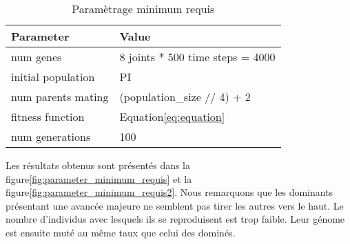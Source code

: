 \documentclass[journal, a4paper]{IEEEtran}
\begin{document}
	\begin{table}[!hbt]
		\begin{center}
		\caption{Paramètrage minimum requis}
		\label{tab:Parametrage_minimum_requis}
		\begin{tabular}{|l|l|}
			\hline
			\textbf{Parameter} & \textbf{Value} \\
			\hline
			num genes & 8 joints * 500 time steps = 4000 \\
			\hline
			initial population & PI \\
			\hline
			num parents mating & (population\_size // 4) + 2 \\
			\hline
			fitness function & Equation\ref{eq:equation} \\
			\hline
			num generations & 100 \\
			\hline
			\end{tabular}
		\end{center}
	\end{table}
	Les résultats obtenus sont présentés dans la figure\ref{fig:parameter_minimum_requis}
	et la figure\ref{fig:parameter_minimum_requis2}.
	Nous remarquons que les dominants présentant une avancée majeure
	ne semblent pas tirer les autres vers le haut.
	Le nombre d'individus avec lesquels ils se reproduisent
	est trop faible. Leur génome est ensuite muté au même taux que celui
	des dominés.

\end{document}
